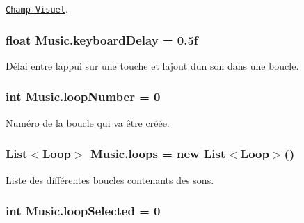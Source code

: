 \href{http://docs.unity3d.com/ScriptReference/Camera-fieldOfView.html}{\tt Champ Visuel}. 

\hypertarget{class_music_a59687d828abbd22accc0fe611026f270}{}
\subsubsection[{keyboard\+Delay}]{\setlength{\rightskip}{0pt plus 5cm}float Music.\+keyboard\+Delay = 0.\+5f}\label{class_music_a59687d828abbd22accc0fe611026f270}


Délai entre l\textquotesingle{}appui sur une touche et l\textquotesingle{}ajout d\textquotesingle{}un son dans une boucle. 

\hypertarget{class_music_a89ea80578a05f37ffefe4f83d6be0425}{}
\subsubsection[{loop\+Number}]{\setlength{\rightskip}{0pt plus 5cm}int Music.\+loop\+Number = 0\hspace{0.3cm}{\ttfamily [private]}}\label{class_music_a89ea80578a05f37ffefe4f83d6be0425}


Numéro de la boucle qui va être créée. 

\hypertarget{class_music_abe986f8a412fa868c341d9ba80e95dfd}{}
\subsubsection[{loops}]{\setlength{\rightskip}{0pt plus 5cm}List$<${\bf Loop}$>$ Music.\+loops = new List$<${\bf Loop}$>$()}\label{class_music_abe986f8a412fa868c341d9ba80e95dfd}


Liste des différentes boucles contenants des sons. 

\hypertarget{class_music_a314e1e14f9b0f2fc88672df0a54ceda2}{}
\subsubsection[{loop\+Selected}]{\setlength{\rightskip}{0pt plus 5cm}int Music.\+loop\+Selected = 0\hspace{0.3cm}{\ttfamily [private]}}\label{class_music_a314e1e14f9b0f2fc88672df0a54ceda2}


